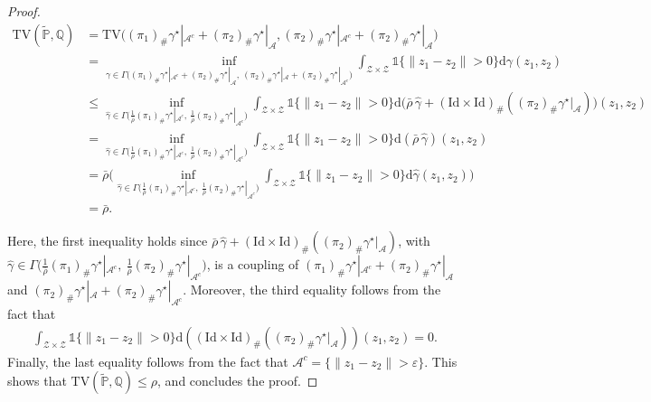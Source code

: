 \documentclass[11pt,a4paper]{article}
\begin{document}
\begin{proof}
\begin{align*}
    \text{TV}(\widetilde{\mathbb P}, \mathbb Q) &= \text{TV}\Big( (\pi_1)_\#\gamma^\star|_{\mathcal A^c} + (\pi_2)_\# \gamma^\star|_{\mathcal A},(\pi_2)_\#\gamma^\star|_{\mathcal A^c} + (\pi_2)_\# \gamma^\star|_{\mathcal A}\Big)\\
    &=\inf_{\gamma\in\Gamma\big( (\pi_1)_\#\gamma^\star|_{\mathcal A^c} + (\pi_2)_\# \gamma^\star|_{\mathcal A}, ~(\pi_2)_\# \gamma^\star|_{\mathcal A} + (\pi_2)_\#\gamma^\star|_{\mathcal A^c}\big)}\int_{\mathcal Z \times \mathcal Z}\mathds{1}\{\|z_1 - z_2\| > 0\} \mathrm{d} \gamma(z_1,z_2)\\
    &\leq \inf_{\widehat{\gamma}\in\Gamma\big(\frac{1}{\bar{\rho}}(\pi_1)_\#\gamma^\star|_{\mathcal A^c}, ~\frac{1}{\bar{\rho}}(\pi_2)_\#\gamma^\star|_{\mathcal A^c}\big)}\int_{\mathcal Z \times \mathcal Z}\mathds{1}\{\|z_1 - z_2\| > 0\} \mathrm{d} \big(\bar{\rho}\,\widehat{\gamma}+(\text{Id} \times \text{Id})_\# \left((\pi_2)_\# \gamma^\star|_{\mathcal A}\right) \big)(z_1,z_2)\\
    &=\inf_{\widehat{\gamma}\in\Gamma\big(\frac{1}{\bar{\rho}}(\pi_1)_\#\gamma^\star|_{\mathcal A^c}, ~\frac{1}{\bar{\rho}}(\pi_2)_\#\gamma^\star|_{\mathcal A^c}\big)}\int_{\mathcal Z \times \mathcal Z}\mathds{1}\{\|z_1 - z_2\| > 0\} \mathrm{d}(\bar{\rho}\,\widehat{\gamma})(z_1,z_2)\\
    &=\bar{\mathbb \rho}\Bigg(\inf_{\widehat{\gamma}\in\Gamma\big(\frac{1}{\bar{\rho}}(\pi_1)_\#\gamma^\star|_{\mathcal A^c}, ~\frac{1}{\bar{\rho}}(\pi_2)_\#\gamma^\star|_{\mathcal A^c}\big)}\int_{\mathcal Z \times \mathcal Z}\mathds{1}\{\|z_1 - z_2\| > 0\} \mathrm{d}\widehat{\gamma}(z_1,z_2)\Bigg)\\
    &= \bar{\rho}.
\end{align*}

Here, the first inequality holds since $\bar{\rho}\, \widehat{\gamma} + (\text{Id} \times \text{Id})_\# \left((\pi_2)_\# \gamma^\star|_{\mathcal A}\right)$, with $\widehat{\gamma}\in\Gamma\big(\frac{1}{\bar{\rho}}(\pi_1)_\#\gamma^\star|_{\mathcal A^c}, ~\frac{1}{\bar{\rho}}(\pi_2)_\#\gamma^\star|_{\mathcal A^c}\big)$, is a coupling of $(\pi_1)_\#\gamma^\star|_{\mathcal A^c} + (\pi_2)_\# \gamma^\star|_{\mathcal A}$ and $(\pi_2)_\# \gamma^\star|_{\mathcal A} + (\pi_2)_\#\gamma^\star|_{\mathcal A^c}$. Moreover, the third equality follows from the fact that 
\begin{align*}
    \int_{\mathcal Z \times \mathcal Z} \mathds{1}\{\|z_1 - z_2\| > 0\} \mathrm{d} \left((\text{Id} \times \text{Id})_\# \left((\pi_2)_\# \gamma^\star|_{\mathcal A}\right) \right)(z_1,z_2) = 0. 
\end{align*}
Finally, the last equality follows from the fact that $\mathcal A^c = \{\|z_1-z_2\|>\varepsilon\}$. This shows that $\text{TV}(\widetilde{\mathbb P}, \mathbb Q) \leq \rho$, and concludes the proof.
\end{proof}
\end{document}
